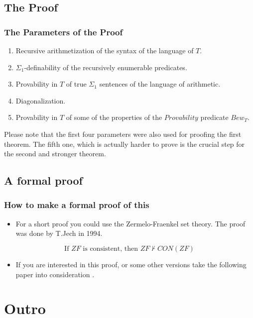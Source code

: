 \documentclass[aspectratio=169]{beamer}
\begin{document}
\subsection{The Proof}
\begin{frame}
	\frametitle{The Parameters of the Proof}
	\begin{enumerate}
		\item Recursive arithmetization of the syntax of the language of $T$.
		\item $\Sigma_1$-definability of the recursively enumerable predicates.
		\item Provability in $T$ of true $\Sigma_1$ sentences of the language of arithmetic.
		\item Diagonalization.
		\item Provability in $T$ of some of the properties of the $Provability$ predicate $Bew_T$.
	\end{enumerate}
	Please note that the first four parameters were also used for proofing the first theorem. The fifth one, which is actually harder to prove is the crucial step for the second and stronger theorem.
	\begin{flushright}
		\cite{bag}
	\end{flushright}
\end{frame}

\subsection{A formal proof}
\begin{frame}
	\frametitle{How to make a formal proof of this}
	\begin{itemize}
		\item For a short proof you could use the Zermelo-Fraenkel set theory. The proof was done by T.Jech in 1994.
	\end{itemize}
	
	\begin{Theorem}
		\[\text{If } ZF \text{ is consistent, then } ZF \nvdash CON(ZF)\]
	\end{Theorem}
	
		\begin{itemize}
		\item If you are interested in this proof, or some other versions take the following paper into consideration \cite{bag}.
	\end{itemize}
\end{frame}

\section{Outro}
\end{document}
